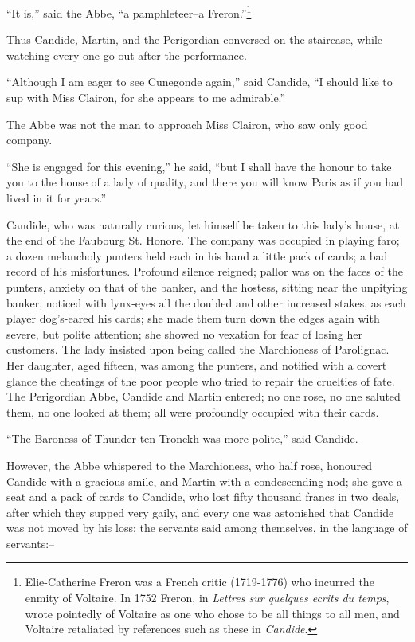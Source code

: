 ``It is,'' said the Abbe, ``a pamphleteer--a Freron.''\footnote{Elie-Catherine Freron was a French critic (1719-1776) who incurred the enmity of Voltaire. In 1752 Freron, in \textit{Lettres sur quelques ecrits du temps}, wrote pointedly of Voltaire as one who chose to be all things to all men, and Voltaire retaliated by references such as these in \textit{Candide}.}

Thus Candide, Martin, and the Perigordian conversed on the staircase, while watching every one go out after the performance.

``Although I am eager to see Cunegonde again,'' said Candide, ``I should like to sup with Miss Clairon, for she appears to me admirable.''

The Abbe was not the man to approach Miss Clairon, who saw only good company.

``She is engaged for this evening,'' he said, ``but I shall have the honour to take you to the house of a lady of quality, and there you will know Paris as if you had lived in it for years.''

Candide, who was naturally curious, let himself be taken to this lady's house, at the end of the Faubourg St. Honore. The company was occupied in playing faro; a dozen melancholy punters held each in his hand a little pack of cards; a bad record of his misfortunes. Profound silence reigned; pallor was on the faces of the punters, anxiety on that of the banker, and the hostess, sitting near the unpitying banker, noticed with lynx-eyes all the doubled and other increased stakes, as each player dog's-eared his cards; she made them turn down the edges again with severe, but polite attention; she showed no vexation for fear of losing her customers. The lady insisted upon being called the Marchioness of Parolignac. Her daughter, aged fifteen, was among the punters, and notified with a covert glance the cheatings of the poor people who tried to repair the cruelties of fate. The Perigordian Abbe, Candide and Martin entered; no one rose, no one saluted them, no one looked at them; all were profoundly occupied with their cards.

``The Baroness of Thunder-ten-Tronckh was more polite,'' said Candide.

However, the Abbe whispered to the Marchioness, who half rose, honoured Candide with a gracious smile, and Martin with a condescending nod; she gave a seat and a pack of cards to Candide, who lost fifty thousand francs in two deals, after which they supped very gaily, and every one was astonished that Candide was not moved by his loss; the servants said among themselves, in the language of servants:--

